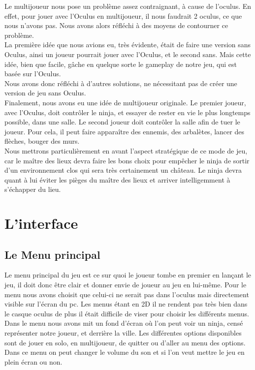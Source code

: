 \documentclass[12pt]{article}
\begin{document}
Le multijoueur nous pose un problème assez contraignant, à cause de l'oculus. En effet, pour jouer avec l'Oculus en multijoueur, il nous faudrait 2 oculus, ce que nous n'avons pas. Nous avons alors réfléchi à des moyens de contourner ce problème.\\
La première idée que nous avions eu, très évidente, était de faire une version sans Oculus, ainsi un joueur pourrait jouer avec l'Oculus, et le second sans. Mais cette idée, bien que facile, gâche en quelque sorte le gameplay de notre jeu, qui est basée sur l'Oculus.\\
Nous avons donc réfléchi à d'autres solutions, ne nécessitant pas de créer une version de jeu sans Oculus.\\
Finalement, nous avons eu une idée de multijoueur originale. Le premier joueur, avec l'Oculus, doit contrôler le ninja, et essayer de rester en vie le plus longtemps possible, dans une salle. Le second joueur doit contrôler la salle afin de tuer le joueur. Pour cela, il peut faire apparaître des ennemis, des arbalètes, lancer des flèches, bouger des murs.\\

Nous mettrons particulièrement en avant l'aspect stratégique de ce mode de jeu, car le maître des lieux devra faire les bons choix pour empêcher le ninja de sortir d'un environnement clos qui sera très certainement un château. Le ninja devra quant à lui éviter les pièges du maître des lieux et arriver intelligemment à s'échapper du lieu.

\section{L'interface}

\subsection{Le Menu principal}

Le menu principal du jeu est ce sur quoi le joueur tombe en premier en lançant le jeu, il doit donc être clair et donner envie de joueur au jeu en lui-même. Pour le menu nous avons choisit que celui-ci ne serait pas dans l'oculus mais directement visible sur l'écran du pc. Les menus étant en 2D il ne rendent pas très bien dans le casque oculus de plus il était difficile de viser pour choisir les différents menus.\\

Dans le menu nous avons mit un fond d'écran où l'on peut voir un ninja, censé représenter notre joueur, et derrière la ville. Les différentes options disponibles sont de jouer en solo, en multijoueur, de quitter ou d'aller au menu des options.\\
Dans ce menu on peut changer le volume du son et si l'on veut mettre le jeu en plein écran ou non.
\end{document}
